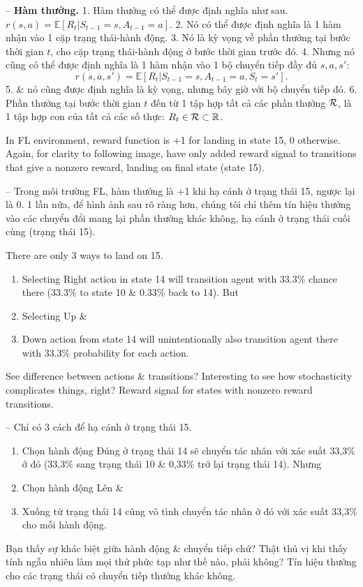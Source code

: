 \documentclass{article}
\begin{document}
\begin{itemize}
\begin{itemize}
        -- {\bf Hàm thưởng.} 1. Hàm thưởng có thể được định nghĩa như sau. $r(s,a) = \mathbb{E}[R_t|S_{t-1} = s,A_{t-1} = a]$. 2. Nó có thể được định nghĩa là 1 hàm nhận vào 1 cặp trạng thái-hành động. 3. Nó là kỳ vọng về phần thưởng tại bước thời gian $t$, cho cặp trạng thái-hành động ở bước thời gian trước đó. 4. Nhưng nó cũng có thể được định nghĩa là 1 hàm nhận vào 1 bộ chuyển tiếp đầy đủ $s,a,s'$:
        \begin{equation*}
            r(s,a,s') = \mathbb{E}[R_t|S_{t-1} = s,A_{t-1} = a,S_t = s'].
        \end{equation*}
        5. \& nó cũng được định nghĩa là kỳ vọng, nhưng bây giờ với bộ chuyển tiếp đó. 6. Phần thưởng tại bước thời gian $t$ đến từ 1 tập hợp tất cả các phần thưởng ${\cal R}$, là 1 tập hợp con của tất cả các số thực: $R_t\in{\cal R}\subset\mathbb{R}$.

        In FL environment, reward function is +1 for landing in state 15, 0 otherwise. Again, for clarity to following image, have only added reward signal to transitions that give a nonzero reward, landing on final state (state 15).

        -- Trong môi trường FL, hàm thưởng là +1 khi hạ cánh ở trạng thái 15, ngược lại là 0. 1 lần nữa, để hình ảnh sau rõ ràng hơn, chúng tôi chỉ thêm tín hiệu thưởng vào các chuyển đổi mang lại phần thưởng khác không, hạ cánh ở trạng thái cuối cùng (trạng thái 15).

        There are only 3 ways to land on 15.
        \begin{enumerate}
            \item Selecting Right action in state 14 will transition agent with 33.3\% chance there (33.3\% to state 10 \& 0.33\% back to 14). But
            \item Selecting Up \&
            \item Down action from state 14 will unintentionally also transition agent there with 33.3\% probability for each action.
        \end{enumerate}
        See difference between actions \& transitions? Interesting to see how stochasticity complicates things, right? {\sf Reward signal for states with nonzero reward transitions.}

        -- Chỉ có 3 cách để hạ cánh ở trạng thái 15.
        \begin{enumerate}
            \item Chọn hành động Đúng ở trạng thái 14 sẽ chuyển tác nhân với xác suất 33,3\% ở đó (33,3\% sang trạng thái 10 \& 0,33\% trở lại trạng thái 14). Nhưng
            \item Chọn hành động Lên \&
            \item Xuống từ trạng thái 14 cũng vô tình chuyển tác nhân ở đó với xác suất 33,3\% cho mỗi hành động.
        \end{enumerate}
        Bạn thấy sự khác biệt giữa hành động \& chuyển tiếp chứ? Thật thú vị khi thấy tính ngẫu nhiên làm mọi thứ phức tạp như thế nào, phải không? {\sf Tín hiệu thưởng cho các trạng thái có chuyển tiếp thưởng khác không.}


\end{itemize}
\end{itemize}
\end{document}

